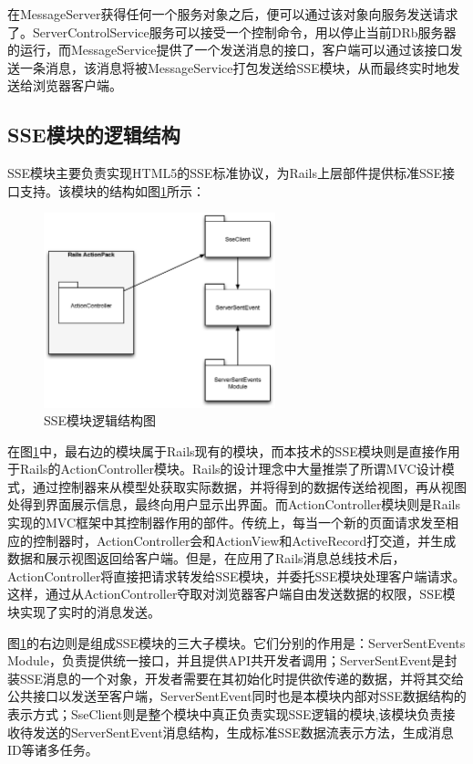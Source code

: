 在MessageServer获得任何一个服务对象之后，便可以通过该对象向服务发送请求了。ServerControlService服务可以接受一个控制命令，用以停止当前DRb服务器的运行，而MessageService提供了一个发送消息的接口，客户端可以通过该接口发送一条消息，该消息将被MessageService打包发送给SSE模块，从而最终实时地发送给浏览器客户端。

\subsection{SSE模块的逻辑结构}
SSE模块主要负责实现HTML5的SSE标准协议，为Rails上层部件提供标准SSE接口支持。该模块的结构如图\ref{fig-sse-module}所示：

\begin{figure}[h]
\centering
\includegraphics[width=0.6\textwidth]{images/overview/sse_module.eps}
\caption{SSE模块逻辑结构图}
\label{fig-sse-module}
\end{figure}

在图\ref{fig-sse-module}中，最右边的模块属于Rails现有的模块，而本技术的SSE模块则是直接作用于Rails的ActionController模块。Rails的设计理念中大量推崇了所谓MVC设计模式，通过控制器来从模型处获取实际数据，并将得到的数据传送给视图，再从视图处得到界面展示信息，最终向用户显示出界面。而ActionController模块则是Rails实现的MVC框架中其控制器作用的部件。传统上，每当一个新的页面请求发至相应的控制器时，ActionController会和ActionView和ActiveRecord打交道，并生成数据和展示视图返回给客户端。但是，在应用了Rails消息总线技术后，ActionController将直接把请求转发给SSE模块，并委托SSE模块处理客户端请求。这样，通过从ActionController夺取对浏览器客户端自由发送数据的权限，SSE模块实现了实时的消息发送。

图\ref{fig-sse-module}的右边则是组成SSE模块的三大子模块。它们分别的作用是：ServerSentEvents Module，负责提供统一接口，并且提供API共开发者调用；ServerSentEvent是封装SSE消息的一个对象，开发者需要在其初始化时提供欲传递的数据，并将其交给公共接口以发送至客户端，ServerSentEvent同时也是本模块内部对SSE数据结构的表示方式；SseClient则是整个模块中真正负责实现SSE逻辑的模块,该模块负责接收待发送的ServerSentEvent消息结构，生成标准SSE数据流表示方法，生成消息ID等诸多任务。

